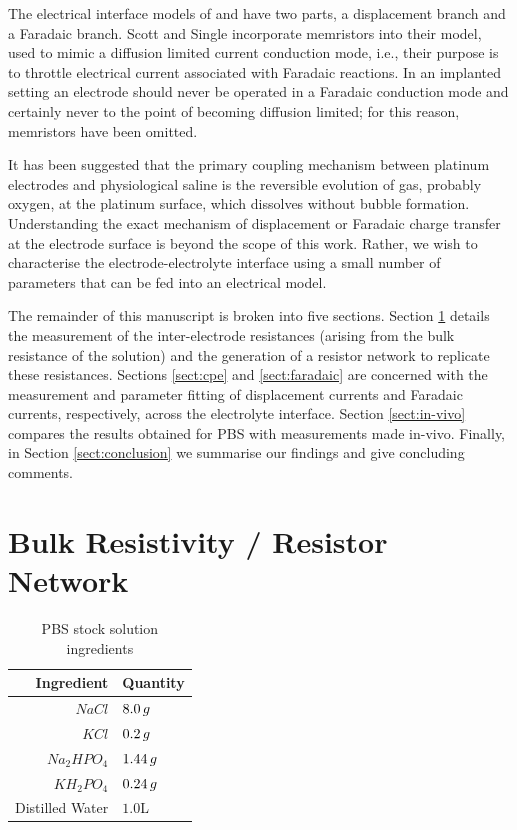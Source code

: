 \documentclass[journal, a4paper]{IEEEtran}
\begin{document}
The electrical interface models of \cite{Franks2005} and \cite{ScottSingle2013} have two parts, a displacement branch and a Faradaic branch.
{
    \color{blue}
    Scott and Single incorporate memristors into their model, used to mimic a diffusion limited current conduction mode, i.e., their purpose is to throttle electrical current associated with Faradaic reactions. In an implanted setting an electrode should never be operated in a Faradaic conduction mode and certainly never to the point of becoming diffusion limited; for this reason, memristors have been omitted.
}

It has been suggested that the primary coupling mechanism between platinum electrodes and physiological saline is the reversible evolution of gas, probably oxygen, at the platinum surface, which dissolves without bubble formation.\cite{Greatbatch1969} Understanding the exact mechanism of displacement or Faradaic charge transfer at the electrode surface is beyond the scope of this work. Rather, we wish to characterise the {electrode-electrolyte interface \color{blue} using a small} {\color{blue} number of} parameters that can be fed into an electrical model.

{
    \color{blue}
    The remainder of this manuscript is broken into five sections. Section \ref{sect:resistorMesh} details the measurement of the inter-electrode resistances {\color{blue}(arising from the bulk resistance of the solution)} and the generation of a resistor network to replicate these resistances.
    Sections \ref{sect:cpe} and \ref{sect:faradaic} are concerned with the measurement and parameter fitting of displacement currents and Faradaic currents, respectively, across the electrolyte interface. Section \ref{sect:in-vivo} compares the results obtained {\color{blue}for} PBS with measurements {\color{blue} made} in-vivo. Finally, in Section \ref{sect:conclusion} we summarise our findings and give concluding comments.
}


\section{{\color{blue}Bulk Resistivity / Resistor} Network }
\label{sect:resistorMesh}

\begin{table}
    \caption{PBS stock solution ingredients}
    \label{tab:PBSrecipe}
    \begin{center}
        \begin{tabular}{r | l}
            Ingredient & Quantity \\
            \hline
            $NaCl$ & $8.0\thinspace g$ \\
            $KCl$ & $0.2\thinspace g$ \\
            $Na_{2}HPO_{4}$ & $1.44\thinspace g$ \\
            $KH_{2}PO_{4}$ & $0.24\thinspace g$ \\
            Distilled Water & $1.0$\thinspace L \\
        \end{tabular}
    \end{center}
\end{table}
\end{document}

